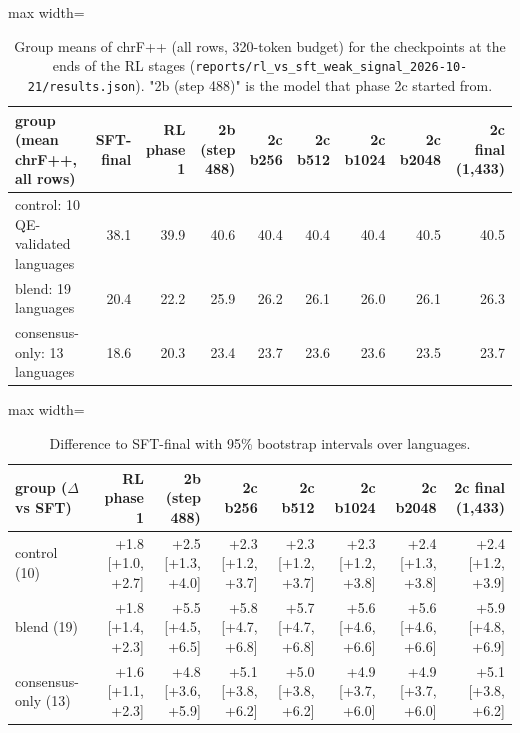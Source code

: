 \begin{table}[t]
\centering
\scriptsize
\setlength{\tabcolsep}{3pt}
\caption{Group means of chrF++ (all rows, 320-token budget) for the checkpoints at the ends of the RL stages (\texttt{reports/rl\_vs\_sft\_weak\_signal\_2026-10-21/results.json}). "2b (step 488)" is the model that phase 2c started from.}
\label{tab:t_phases}
\begin{adjustbox}{max width=\linewidth}
{\def\LTcaptype{none} %
\begin{tabular}{@{}lrrrrrrrr@{}}
\toprule
group (mean chrF++, all rows) & SFT-final & RL phase 1 & 2b (step 488) & 2c b256 & 2c b512 & 2c b1024 & 2c b2048 & 2c final (1,433) \\
\midrule
control: 10 QE-validated languages & 38.1 & 39.9 & 40.6 & 40.4 & 40.4 & 40.4 & 40.5 & 40.5 \\
blend: 19 languages & 20.4 & 22.2 & 25.9 & 26.2 & 26.1 & 26.0 & 26.1 & 26.3 \\
consensus-only: 13 languages & 18.6 & 20.3 & 23.4 & 23.7 & 23.6 & 23.6 & 23.5 & 23.7 \\
\bottomrule
\end{tabular}
}
\end{adjustbox}
\end{table}

\begin{table}[t]
\centering
\footnotesize
\setlength{\tabcolsep}{3pt}
\caption{Difference to SFT-final with 95\% bootstrap intervals over languages.}
\label{tab:t_phases_delta}
\begin{adjustbox}{max width=\linewidth}
{\def\LTcaptype{none} %
\begin{tabular}{@{}lrrrrrrr@{}}
\toprule
group (\(\Delta\) vs SFT) & RL phase 1 & 2b (step 488) & 2c b256 & 2c b512 & 2c b1024 & 2c b2048 & 2c final (1,433) \\
\midrule
control (10) & +1.8 {[}+1.0, +2.7{]} & +2.5 {[}+1.3, +4.0{]} & +2.3 {[}+1.2, +3.7{]} & +2.3 {[}+1.2, +3.7{]} & +2.3 {[}+1.2, +3.8{]} & +2.4 {[}+1.3, +3.8{]} & +2.4 {[}+1.2, +3.9{]} \\
blend (19) & +1.8 {[}+1.4, +2.3{]} & +5.5 {[}+4.5, +6.5{]} & +5.8 {[}+4.7, +6.8{]} & +5.7 {[}+4.7, +6.8{]} & +5.6 {[}+4.6, +6.6{]} & +5.6 {[}+4.6, +6.6{]} & +5.9 {[}+4.8, +6.9{]} \\
consensus-only (13) & +1.6 {[}+1.1, +2.3{]} & +4.8 {[}+3.6, +5.9{]} & +5.1 {[}+3.8, +6.2{]} & +5.0 {[}+3.8, +6.2{]} & +4.9 {[}+3.7, +6.0{]} & +4.9 {[}+3.7, +6.0{]} & +5.1 {[}+3.8, +6.2{]} \\
\bottomrule
\end{tabular}
}
\end{adjustbox}
\end{table}

